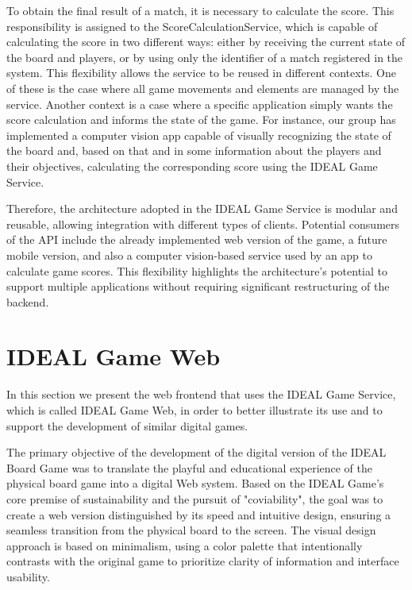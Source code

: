 \documentclass[english]{sbc2025}
\begin{document}
To obtain the final result of a match, it is necessary to calculate the score. This responsibility is assigned to the ScoreCalculationService, which is capable of calculating the score in two different ways: either by receiving the current state of the board and players, or by using only the identifier of a match registered in the system. This flexibility allows the service to be reused in different contexts. One of these is the case where all game movements and elements are managed by the service. Another context is a case where a specific application simply wants the score calculation and informs the state of the game. For instance, our group has implemented a computer vision app capable of visually recognizing the state of the board and, based on that and in some information about the players and their objectives, calculating the corresponding score using the IDEAL Game Service.

Therefore, the architecture adopted in the IDEAL Game Service is modular and reusable, allowing integration with different types of clients. Potential consumers of the API include the already implemented web version of the game, a future mobile version, and also a computer vision-based service used by an app to calculate game scores. This flexibility highlights the architecture’s potential to support multiple applications without requiring significant restructuring of the backend.


\section{IDEAL Game Web}

In this section we present the web frontend that uses the IDEAL Game Service, which is called IDEAL Game Web, in order to better illustrate its use and to support the development of similar digital games.

The primary objective of the development of the digital version of the IDEAL Board Game  was to translate the playful and educational experience of the physical board game into a digital Web system. Based on the IDEAL Game's core premise of sustainability and the pursuit of "coviability", the goal was to create a web version distinguished by its speed and intuitive design, ensuring a seamless transition from the physical board to the screen. The visual design approach is based on minimalism, using a color palette that intentionally contrasts with the original game to prioritize clarity of information and interface usability. 
\end{document}

